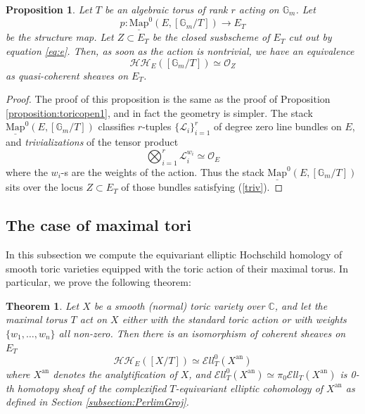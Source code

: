 \documentclass[11pt,letterpaper]{amsart}
\newtheorem{theorem}[dummy]{Theorem}
\newtheorem{proposition}[dummy]{Proposition}
\newcommand{\bC}{\mathbb{C}}
\newcommand{\bG}{\mathbb{G}}
\newcommand{\cO}{\mathcal{O}}
\newcommand{\cL}{\mathcal{L}}
\newcommand{\cHH}{\mathcal{HH}}
\newcommand{\Mapo}[2]{\underline{\mathrm{Map}}^{0}\left (#1,#2\right )}
\newcommand{\Pic}{\underline{\mathrm{Pic}}}
\newcommand{\El}{\mathcal{E}ll}
\newcommand{\an}{\mathrm{an}}
\begin{document}
\begin{proposition}\label{proposition:toricopen2}
Let $T$ be an algebraic torus of rank $r$ acting on $\bG_m$.
Let $$p:\Mapo{E}{[\bG_m/T]}\rightarrow E_T$$ be the 
structure map. Let $Z \subset E_T$ be 
the closed susbscheme of $E_T$ cut out by equation \eqref{eq:e}. 
Then, as soon as the action is nontrivial, we have an equivalence 
\begin{equation*}
    \cHH_E([\bG_m/T])\simeq\cO_Z
\end{equation*}
as quasi-coherent sheaves on $E_T$. 
\end{proposition}
\begin{proof}
The proof of this proposition is the same as the proof of Proposition \ref{proposition:toricopen1}, and in fact the geometry is simpler. The stack $\Mapo{E}{[\bG_m/T]}$ classifies 
 $r$-tuples $\{\cL_i\}_{i=1}^{r}$ of degree zero line bundles on $E$, and \emph{trivializations} of the tensor product 
\begin{equation}
\label{triv}
 \bigotimes_{i=1}^{r} \cL_i^{w_i} \simeq \cO_E
\end{equation}
 where the $w_i$-s are the weights of the action. Thus  the stack 
 $\Mapo{E}{[\bG_m/T]}$ sits over the locus $Z \subset E_T$ of those bundles satisfying  (\ref{triv}).
\end{proof}
 
\subsection{The case of maximal tori}
In this subsection we compute the equivariant elliptic Hochschild homology of smooth toric varieties equipped with the toric action of their maximal torus.
In particular, we prove the following theorem:
\begin{theorem}\label{theorem:ellipticohoftoricvar}
Let $X$ be a smooth (normal) toric variety over $\bC$, and let the maximal torus $T$ act on $X$ either with the standard toric action or with weights $\{w_1,\dots,w_n\}$ all non-zero. Then there is an isomorphism of coherent sheaves on $E_T$
\begin{equation*}
\cHH_E([X/T])\simeq\El_T^0(X^\an)
\end{equation*}
where $X^\an$ denotes the analytification of $X$, and $\El_T^0(X^\an)\simeq\pi_0\El_T(X^\an)$ is 0-th homotopy sheaf of the complexified $T$-equivariant elliptic cohomology of $X^\an$ as defined in Section \ref{subsection:PerlimGroj}. 
\end{theorem}
\end{document}
